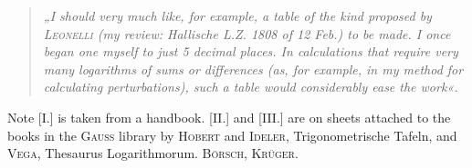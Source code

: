 \begin{quotation}\itshape
„I should very much like, for example, a table of the kind proposed by \textup{\textsc{Leonelli}}
(my review: Hallische L.Z. 1808 of 12 Feb.) to be made. I once began one myself
to just 5 decimal places. In calculations that require very many logarithms of
sums or differences (as, for example, in my method for calculating perturbations),
such a table would considerably ease the work«.
\end{quotation}

Note [I.] is taken from a handbook. [II.] and [III.] are on sheets attached to the
books in the \textsc{Gauss} library by \textsc{Hobert} and \textsc{Ideler},
Trigonometrische Tafeln, and \textsc{Vega}, Thesaurus Logarithmorum.
\hfill \textsc{Börsch, Krüger}.

